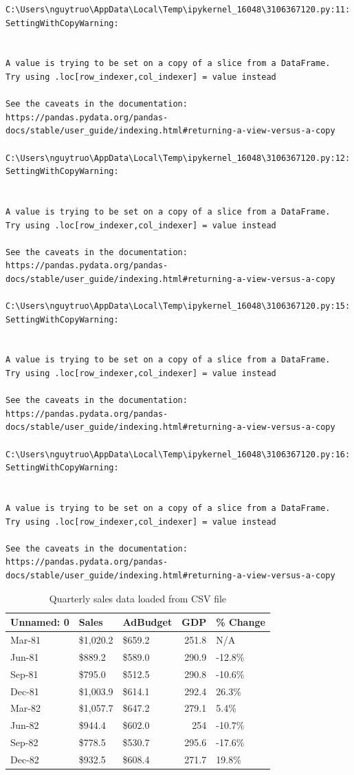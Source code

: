 \documentclass[
  letterpaper,
  oneside,
  openany]{MastersDoctoralThesis}
\begin{document}
\begin{verbatim}
C:\Users\nguytruo\AppData\Local\Temp\ipykernel_16048\3106367120.py:11: SettingWithCopyWarning:


A value is trying to be set on a copy of a slice from a DataFrame.
Try using .loc[row_indexer,col_indexer] = value instead

See the caveats in the documentation: https://pandas.pydata.org/pandas-docs/stable/user_guide/indexing.html#returning-a-view-versus-a-copy

C:\Users\nguytruo\AppData\Local\Temp\ipykernel_16048\3106367120.py:12: SettingWithCopyWarning:


A value is trying to be set on a copy of a slice from a DataFrame.
Try using .loc[row_indexer,col_indexer] = value instead

See the caveats in the documentation: https://pandas.pydata.org/pandas-docs/stable/user_guide/indexing.html#returning-a-view-versus-a-copy

C:\Users\nguytruo\AppData\Local\Temp\ipykernel_16048\3106367120.py:15: SettingWithCopyWarning:


A value is trying to be set on a copy of a slice from a DataFrame.
Try using .loc[row_indexer,col_indexer] = value instead

See the caveats in the documentation: https://pandas.pydata.org/pandas-docs/stable/user_guide/indexing.html#returning-a-view-versus-a-copy

C:\Users\nguytruo\AppData\Local\Temp\ipykernel_16048\3106367120.py:16: SettingWithCopyWarning:


A value is trying to be set on a copy of a slice from a DataFrame.
Try using .loc[row_indexer,col_indexer] = value instead

See the caveats in the documentation: https://pandas.pydata.org/pandas-docs/stable/user_guide/indexing.html#returning-a-view-versus-a-copy
\end{verbatim}

\begin{longtable}[]{@{}lllrl@{}}

\caption{\label{tbl-app-b-sales}Quarterly sales data loaded from CSV
file}

\tabularnewline

\toprule\noalign{}
Unnamed: 0 & Sales & AdBudget & GDP & \% Change \\
\midrule\noalign{}
\endhead
\bottomrule\noalign{}
\endlastfoot
Mar-81 & \$1,020.2 & \$659.2 & 251.8 & N/A \\
Jun-81 & \$889.2 & \$589.0 & 290.9 & -12.8\% \\
Sep-81 & \$795.0 & \$512.5 & 290.8 & -10.6\% \\
Dec-81 & \$1,003.9 & \$614.1 & 292.4 & 26.3\% \\
Mar-82 & \$1,057.7 & \$647.2 & 279.1 & 5.4\% \\
Jun-82 & \$944.4 & \$602.0 & 254 & -10.7\% \\
Sep-82 & \$778.5 & \$530.7 & 295.6 & -17.6\% \\
Dec-82 & \$932.5 & \$608.4 & 271.7 & 19.8\% \\

\end{longtable}
\end{document}
